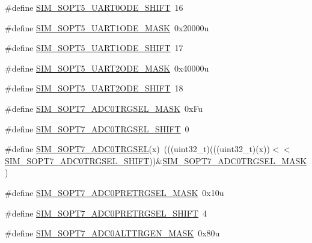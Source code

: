 \begin{DoxyCompactItemize}
\item 
\#define \hyperlink{group___s_i_m___register___masks_gaa972dcd4d7e6d7a72e9da197afd19f03}{S\+I\+M\+\_\+\+S\+O\+P\+T5\+\_\+\+U\+A\+R\+T0\+O\+D\+E\+\_\+\+S\+H\+I\+FT}~16
\item 
\#define \hyperlink{group___s_i_m___register___masks_ga8b6934ad333eab03eb0884605ae53383}{S\+I\+M\+\_\+\+S\+O\+P\+T5\+\_\+\+U\+A\+R\+T1\+O\+D\+E\+\_\+\+M\+A\+SK}~0x20000u
\item 
\#define \hyperlink{group___s_i_m___register___masks_gaefef8a191a226bed4aaa950f3ea66e3e}{S\+I\+M\+\_\+\+S\+O\+P\+T5\+\_\+\+U\+A\+R\+T1\+O\+D\+E\+\_\+\+S\+H\+I\+FT}~17
\item 
\#define \hyperlink{group___s_i_m___register___masks_ga2b5bbe588bc3ea2299deead3e18b3932}{S\+I\+M\+\_\+\+S\+O\+P\+T5\+\_\+\+U\+A\+R\+T2\+O\+D\+E\+\_\+\+M\+A\+SK}~0x40000u
\item 
\#define \hyperlink{group___s_i_m___register___masks_gad3283784bd7916c036b2299401fa7468}{S\+I\+M\+\_\+\+S\+O\+P\+T5\+\_\+\+U\+A\+R\+T2\+O\+D\+E\+\_\+\+S\+H\+I\+FT}~18
\item 
\#define \hyperlink{group___s_i_m___register___masks_gaeda70babef834cacace2c775d62bb4ae}{S\+I\+M\+\_\+\+S\+O\+P\+T7\+\_\+\+A\+D\+C0\+T\+R\+G\+S\+E\+L\+\_\+\+M\+A\+SK}~0x\+Fu
\item 
\#define \hyperlink{group___s_i_m___register___masks_ga914ced2a5cf4e7f37371d52d34d4a930}{S\+I\+M\+\_\+\+S\+O\+P\+T7\+\_\+\+A\+D\+C0\+T\+R\+G\+S\+E\+L\+\_\+\+S\+H\+I\+FT}~0
\item 
\#define \hyperlink{group___s_i_m___register___masks_gab4fec73a0cfeecaa863fc29f85326f4a}{S\+I\+M\+\_\+\+S\+O\+P\+T7\+\_\+\+A\+D\+C0\+T\+R\+G\+S\+EL}(x)~(((uint32\+\_\+t)(((uint32\+\_\+t)(x))$<$$<$\hyperlink{group___s_i_m___register___masks_ga914ced2a5cf4e7f37371d52d34d4a930}{S\+I\+M\+\_\+\+S\+O\+P\+T7\+\_\+\+A\+D\+C0\+T\+R\+G\+S\+E\+L\+\_\+\+S\+H\+I\+FT}))\&\hyperlink{group___s_i_m___register___masks_gaeda70babef834cacace2c775d62bb4ae}{S\+I\+M\+\_\+\+S\+O\+P\+T7\+\_\+\+A\+D\+C0\+T\+R\+G\+S\+E\+L\+\_\+\+M\+A\+SK})
\item 
\#define \hyperlink{group___s_i_m___register___masks_ga74544c6c9d4fbc593884681ac79c796f}{S\+I\+M\+\_\+\+S\+O\+P\+T7\+\_\+\+A\+D\+C0\+P\+R\+E\+T\+R\+G\+S\+E\+L\+\_\+\+M\+A\+SK}~0x10u
\item 
\#define \hyperlink{group___s_i_m___register___masks_gaee870f942318f14376ee9e6d5558e2ff}{S\+I\+M\+\_\+\+S\+O\+P\+T7\+\_\+\+A\+D\+C0\+P\+R\+E\+T\+R\+G\+S\+E\+L\+\_\+\+S\+H\+I\+FT}~4
\item 
\#define \hyperlink{group___s_i_m___register___masks_ga6390cd75db35ecc6c5fc6d5b0d417a7d}{S\+I\+M\+\_\+\+S\+O\+P\+T7\+\_\+\+A\+D\+C0\+A\+L\+T\+T\+R\+G\+E\+N\+\_\+\+M\+A\+SK}~0x80u
$$
\end{DoxyCompactItemize}
